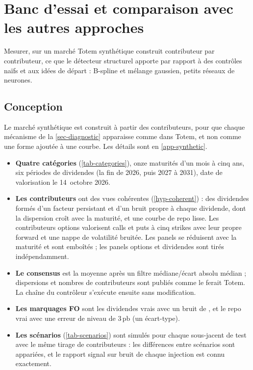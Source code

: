 \section{Banc d'essai et comparaison avec les autres approches}\label{sec-banc}

\begin{objectif}
Mesurer, sur un marché Totem synthétique construit contributeur par contributeur, ce que le détecteur structurel
apporte par rapport à des contrôles naïfs et aux idées de départ : B-spline et mélange gaussien, petits réseaux de
neurones.
\end{objectif}

\subsection{Conception}
Le marché synthétique est construit à partir des contributeurs, pour que chaque mécanisme de la \cref{sec-diagnostic}
apparaisse comme dans Totem, et non comme une forme ajoutée à une courbe. Les détails sont en \cref{app-synthetic}.
\begin{itemize}
\item \textbf{Quatre catégories} (\cref{tab-categories}), onze maturités d'un mois à cinq ans, six périodes de
dividendes (la fin de 2026, puis 2027 à 2031), date de valorisation le 14~octobre 2026.
\item \textbf{Les contributeurs} ont des vues cohérentes (\cref{hyp-coherent}) : des dividendes formés d'un facteur
persistant et d'un bruit propre à chaque dividende, dont la dispersion croît avec la maturité, et une courbe de repo
lisse. Les contributeurs options valorisent calls et puts à cinq strikes avec leur propre forward et une nappe de
volatilité bruitée. Les panels se réduisent avec la maturité et sont emboîtés ; les panels options et dividendes sont
tirés indépendamment.
\item \textbf{Le consensus} est la moyenne après un filtre médiane/écart absolu médian ; dispersions et nombres de
contributeurs sont publiés comme le ferait Totem. La chaîne du contrôleur s'exécute ensuite sans modification.
\item \textbf{Les marquages FO} sont les dividendes vrais avec un bruit de , et le repo vrai avec une erreur de
niveau de $3$\,pb (un écart-type).
\item \textbf{Les scénarios} (\cref{tab-scenarios}) sont simulés pour chaque sous-jacent de test avec le même tirage de
contributeurs : les différences entre scénarios sont appariées, et le rapport signal sur bruit de chaque injection
est connu exactement.
\end{itemize}

